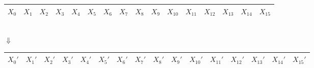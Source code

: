 \begin{center}\begin{tabular}{|c|c|c|c|c|c|c|c|c|c|c|c|c|c|c|c|}\hline
	\cellcolor{red!20} $X_0$ & \cellcolor{red!20}$X_1$ & \cellcolor{red!20}$X_2$ & \cellcolor{red!20}$X_3$ & \cellcolor{green!20} $X_4$ & \cellcolor{green!20}$X_5$ & \cellcolor{green!20}$X_6$ & \cellcolor{green!20} $X_7$ & \cellcolor{blue!20} $X_8$ & \cellcolor{blue!20} $X_9$ & \cellcolor{blue!20} $X_{10}$ & \cellcolor{blue!20} $X_{11}$ & \cellcolor{yellow!20} $X_{12}$ & \cellcolor{yellow!20} $X_{13}$ & \cellcolor{yellow!20} $X_{14}$ & \cellcolor{yellow!20} $X_{15}$ \\ \hline
\end{tabular}\\
$\Downarrow$\\
\begin{tabular}{|c|c|c|c|c|c|c|c|c|c|c|c|c|c|c|c|}\hline
	\cellcolor{red!20} $X_0'$ & \cellcolor{red!20}$X_1'$ & \cellcolor{red!20}$X_2'$ & \cellcolor{red!20}$X_3'$ & \cellcolor{green!20} $X_4'$ & \cellcolor{green!20}$X_5'$ & \cellcolor{green!20}$X_6'$ & \cellcolor{green!20} $X_7'$ & \cellcolor{blue!20} $X_8'$ & \cellcolor{blue!20} $X_9'$ & \cellcolor{blue!20} $X_{10}'$ & \cellcolor{blue!20} $X_{11}'$ & \cellcolor{yellow!20} $X_{12}'$ & \cellcolor{yellow!20} $X_{13}'$ & \cellcolor{yellow!20} $X_{14}'$ & \cellcolor{yellow!20} $X_{15}'$ \\ \hline
\end{tabular}\\
\end{center}


